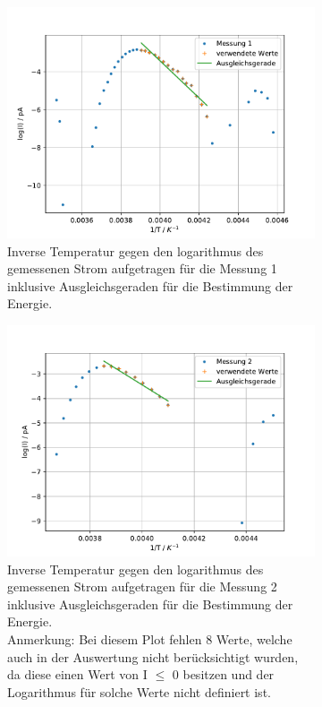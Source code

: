 \begin{figure}
  
  \centering
  \begin{subfigure}[b]{0.75\textwidth}
      \centering
      \includegraphics[width=\textwidth]{build_j/log(I)_1durchT_1.pdf}
      \caption{Inverse Temperatur gegen den logarithmus des gemessenen Strom aufgetragen für die Messung 1 inklusive Ausgleichsgeraden für die Bestimmung der Energie.}
  \end{subfigure}
  \hfill
  \begin{subfigure}[b]{0.75\textwidth}
      \centering
      \includegraphics[width=\textwidth]{build_j/log(I)_1durchT_2.pdf}
      \caption{Inverse Temperatur gegen den logarithmus des gemessenen Strom aufgetragen für die Messung 2 inklusive Ausgleichsgeraden für die Bestimmung der Energie. \\
      Anmerkung: Bei diesem Plot fehlen 8 Werte, welche auch in der Auswertung nicht berücksichtigt wurden, da diese einen Wert von I $\leq$ 0 besitzen und der Logarithmus
      für solche Werte nicht definiert ist.}
      \label{fig:met1b}
  \end{subfigure}
  \caption{}
  \label{fig:met1}
\end{figure}


